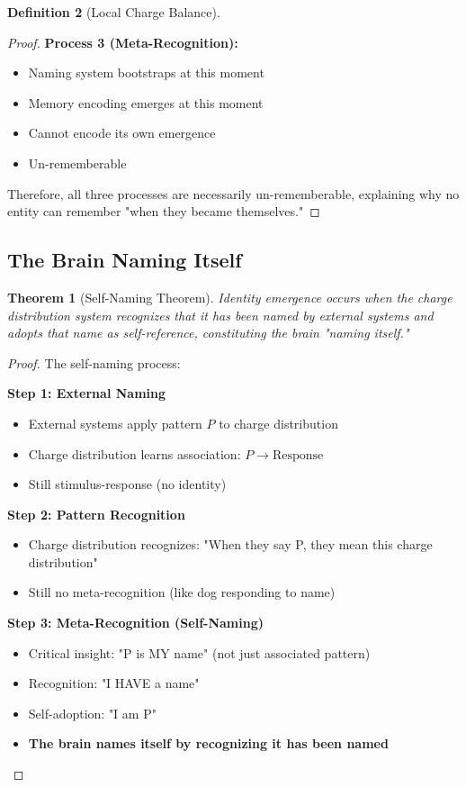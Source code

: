 \documentclass[12pt,a4paper]{article}
\theoremstyle{plain}
\newtheorem{theorem}{Theorem}[section]
\theoremstyle{definition}
\newtheorem{definition}[theorem]{Definition}
\theoremstyle{remark}
\begin{document}
\begin{definition}[Local Charge Balance]
\begin{proof}
\textbf{Process 3 (Meta-Recognition):}
\begin{itemize}
\item Naming system bootstraps at this moment
\item Memory encoding emerges at this moment
\item Cannot encode its own emergence
\item Un-rememberable
\end{itemize}

Therefore, all three processes are necessarily un-rememberable, explaining why no entity can remember "when they became themselves."
\end{proof}

\subsection{The Brain Naming Itself}

\begin{theorem}[Self-Naming Theorem]
Identity emergence occurs when the charge distribution system recognizes that it has been named by external systems and adopts that name as self-reference, constituting the brain "naming itself."
\end{theorem}

\begin{proof}
The self-naming process:

\textbf{Step 1: External Naming}
\begin{itemize}
\item External systems apply pattern $P$ to charge distribution
\item Charge distribution learns association: $P \rightarrow \text{Response}$
\item Still stimulus-response (no identity)
\end{itemize}

\textbf{Step 2: Pattern Recognition}
\begin{itemize}
\item Charge distribution recognizes: "When they say P, they mean this charge distribution"
\item Still no meta-recognition (like dog responding to name)
\end{itemize}

\textbf{Step 3: Meta-Recognition (Self-Naming)}
\begin{itemize}
\item Critical insight: "P is MY name" (not just associated pattern)
\item Recognition: "I HAVE a name"
\item Self-adoption: "I am P"
\item \textbf{The brain names itself by recognizing it has been named}
\end{itemize}


\end{proof}
\end{definition}
\end{document}
